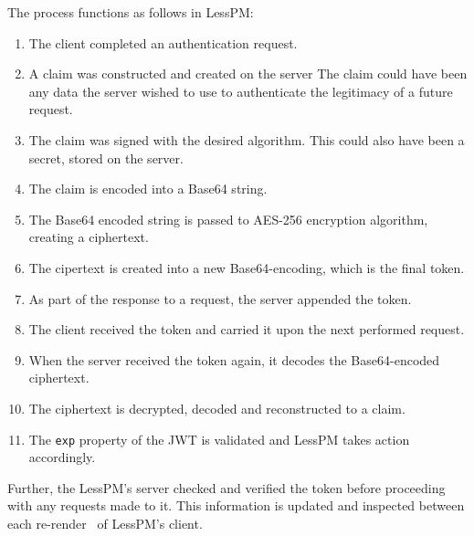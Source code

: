 The process functions as follows in LessPM:
\begin{enumerate}
  \item The client completed an authentication request.
  \item A claim was constructed and created on the server
  The claim could have been any data the server wished to use to authenticate
  the legitimacy of a future request.
  \item The claim was signed with the desired algorithm.
  This could also have been a secret, stored on the server.
  \item The claim is encoded into a Base64 string.
  \item The Base64 encoded string is passed to AES-256 encryption algorithm,
  creating a ciphertext.
  \item The cipertext is created into a new Base64-encoding, which is the
  final token.
  \item As part of the response to a request, the server appended the
  token.
  \item The client received the token and carried it upon the next performed
  request.
  \item When the server received the token again, it decodes the
  Base64-encoded ciphertext.
  \item The ciphertext is decrypted, decoded and reconstructed to a claim.
  \item The \texttt{exp} property of the JWT is validated and LessPM takes
  action accordingly.
\end{enumerate}

Further, the LessPM's server checked and verified the token before proceeding
with any requests made to it.
This information is updated and inspected between each
re-render~\cite{react-component} of LessPM's client.